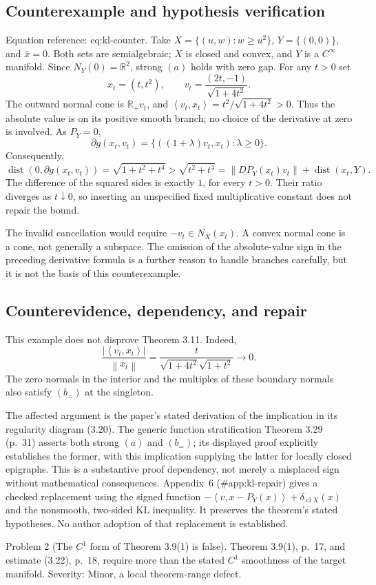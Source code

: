 \documentclass[10pt]{article}
\begin{document}
\subsection*{Counterexample and hypothesis verification}
Equation reference: eq:kl-counter. Take \(X=\{(u,w):w\ge u^2\}\), \(Y=\{(0,0)\}\), and \(\bar x=0\). Both sets are semialgebraic; \(X\) is closed and convex, and \(Y\) is a \(C^\infty\) manifold. Since \(N_Y(0)=\mathbb R^2\), strong \((a)\) holds with zero gap. For any \(t>0\) set \[x_t=(t,t^2),\qquad
 v_t=\frac{(2t,-1)}{\sqrt{1+4t^2}}.\] The outward normal cone is \(\mathbb R_+v_t\), and \(\left\langle v_t,x_t\right\rangle=t^2/\sqrt{1+4t^2}>0\). Thus the absolute value is on its positive smooth branch; no choice of the derivative at zero is involved. As \(P_Y=0\), \[\partial g(x_t,v_t)
 =\{((1+\lambda)v_t,x_t):\lambda\ge0\}.\] Consequently, \[
 \mathop{\mathrm{dist}}(0,\partial g(x_t,v_t))=\sqrt{1+t^2+t^4}
 >\sqrt{t^2+t^4}
 =\left\|DP_Y(x_t)v_t\right\|+\mathop{\mathrm{dist}}(x_t,Y).\] The difference of the squared sides is exactly \(1\), for every \(t>0\). Their ratio diverges as \(t\downarrow0\), so inserting an unspecified fixed multiplicative constant does not repair the bound.\par
The invalid cancellation would require \(-v_t\in N_X(x_t)\). A convex normal cone is a cone, not generally a subspace. The omission of the absolute-value sign in the preceding derivative formula is a further reason to handle branches carefully, but it is not the basis of this counterexample.\par
\subsection*{Counterevidence, dependency, and repair}
This example does not disprove Theorem 3.11. Indeed, \[\frac{|\left\langle v_t,x_t\right\rangle|}{\left\|x_t\right\|}
 =\frac{t}{\sqrt{1+4t^2}\sqrt{1+t^2}}\longrightarrow0.\] The zero normals in the interior and the multiples of these boundary normals also satisfy \((b_=)\) at the singleton.\par
The affected argument is the paper’s stated derivation of the implication in its regularity diagram (3.20). The generic function stratification Theorem 3.29 (p. 31) asserts both strong \((a)\) and \((b_=)\); its displayed proof explicitly establishes the former, with this implication supplying the latter for locally closed epigraphs. This is a substantive proof dependency, not merely a misplaced sign without mathematical consequences. Appendix 6 (\#app:kl-repair) gives a checked replacement using the signed function \(-\left\langle v,x-P_Y(x)\right\rangle+\delta_{\mathop{\mathrm{cl}}X}(x)\) and the nonsmooth, two-sided KL inequality. It preserves the theorem’s stated hypotheses. No author adoption of that replacement is established.\par
Problem 2 (The \(C^1\) form of Theorem 3.9(1) is false).  Theorem 3.9(1), p. 17, and estimate (3.22), p. 18, require more than the stated \(C^1\) smoothness of the target manifold. Severity: Minor, a local theorem-range defect.\par
\end{document}
